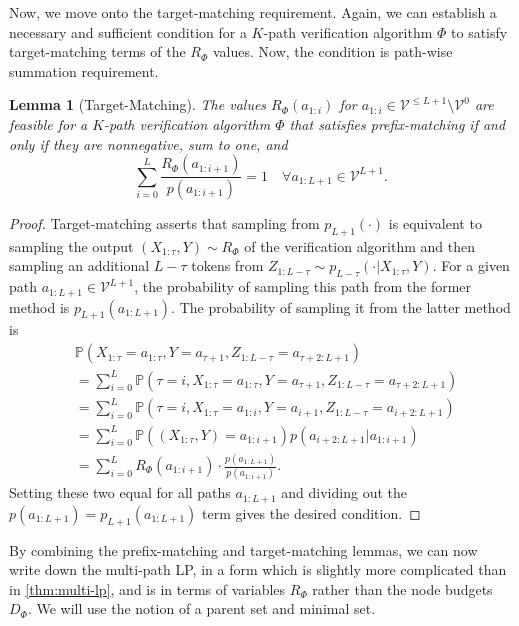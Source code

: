 \documentclass{article}
\theoremstyle{plain}
\newtheorem{lemma}[theorem]{Lemma}
\theoremstyle{definition}
\theoremstyle{remark}
\newcommand{\V}{\mathcal{V}}
\begin{document}
Now, we move onto the target-matching requirement. Again, we can establish a necessary and sufficient condition for a $K$-path verification algorithm $\Phi$ to satisfy target-matching terms of the $R_\Phi$ values. Now, the condition is path-wise summation requirement. 

\begin{lemma}[Target-Matching]
    The values $R_\Phi(a_{1:i})$ for $a_{1:i} \in \V^{\leq L+1}\setminus \V^0$ are feasible for a $K$-path verification algorithm $\Phi$ that satisfies prefix-matching if and only if they are nonnegative, sum to one, and
    \begin{equation}
        \sum_{i=0}^{L} \frac{R_\Phi(a_{1:i+1})}{p(a_{1:i+1})} = 1\quad \forall a_{1:L+1} \in \V^{L+1}.
    \end{equation}
    \label{lem:target}
\end{lemma}
\begin{proof}
    Target-matching asserts that sampling from $p_{L+1}(\cdot)$ is equivalent to sampling the output $(X_{1:\tau},Y) \sim R_\Phi$ of the verification algorithm and then sampling an additional $L-\tau$ tokens from $Z_{1:L-\tau}\sim p_{L-\tau}(\cdot|X_{1:\tau},Y)$. For a given path $a_{1:L+1} \in \V^{L+1}$, the probability of sampling this path from the former method is $p_{L+1}(a_{1:L+1})$. The probability of sampling it from the latter method is
    \begin{align}
         &\mathbb{P}(X_{1:\tau}=a_{1:\tau},Y=a_{\tau+1},Z_{1:L-\tau}=a_{\tau+2:L+1}) \\ &= \sum_{i=0}^L  \mathbb{P}(\tau=i,X_{1:\tau}=a_{1:\tau},Y=a_{\tau+1},Z_{1:L-\tau}=a_{\tau+2:L+1}) \\
          &= \sum_{i=0}^L  \mathbb{P}(\tau=i,X_{1:\tau}=a_{1:i},Y=a_{i+1},Z_{1:L-\tau}=a_{i+2:L+1}) \\
         &= \sum_{i=0}^L  \mathbb{P}((X_{1:\tau},Y)=a_{1:i+1})p(a_{i+2:L+1}|a_{1:i+1}) \\
         &=\sum_{i=0}^L R_\Phi(a_{1:i+1})\cdot \frac{p(a_{1:L+1})}{p(a_{1:i+1})}.
    \end{align}
    Setting these two equal for all paths $a_{1:L+1}$ and dividing out the $p(a_{1:L+1})=p_{L+1}(a_{1:L+1})$ term gives the desired condition.
\end{proof}

By combining the prefix-matching and target-matching lemmas, we can now write down the multi-path LP, in a form which is slightly more complicated than in \cref{thm:multi-lp}, and is in terms of variables $R_\Phi$ rather than the node budgets $D_\Phi$. We will use the notion of a parent set and minimal set.
\end{document}
